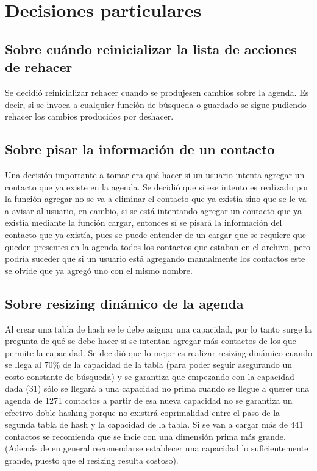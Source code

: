 \documentclass[11pt]{article}
\begin{document}
\section{Decisiones particulares}

    \subsection{Sobre cu\'ando reinicializar la lista de acciones de rehacer}
    Se decidi\'o reinicializar rehacer cuando se produjesen cambios sobre la agenda. Es decir, si se invoca a cualquier funci\'on de b\'usqueda o guardado se sigue pudiendo rehacer los cambios producidos por deshacer.

    \subsection{Sobre pisar la informaci\'on de un contacto}
    Una decisi\'on importante a tomar era qu\'e hacer si un usuario intenta agregar un contacto que ya existe en la agenda. Se decidi\'o que si ese intento es realizado por la funci\'on agregar no se va a eliminar el contacto que ya exist\'ia sino que se le va a avisar al usuario, en cambio, si se est\'a intentando agregar un contacto que ya exist\'ia mediante la funci\'on cargar, entonces s\'i se pisar\'a la informaci\'on del contacto que ya exist\'ia,
    pues se puede entender de un cargar que se requiere que queden presentes en la agenda todos los contactos que estaban en el archivo, pero podr\'ia suceder que si un usuario est\'a agregando manualmente los contactos este se olvide que ya agreg\'o uno con el mismo nombre.

    \subsection{Sobre resizing din\'amico de la agenda}
    Al crear una tabla de hash se le debe asignar una capacidad, por lo tanto surge la pregunta de qu\'e se debe hacer si se intentan agregar m\'as contactos de los que permite la capacidad. Se decidi\'o que lo mejor 
    es realizar resizing din\'amico cuando se llega al $70\%$ de la capacidad de la tabla (para poder seguir asegurando un costo constante de b\'usqueda) y se garantiza que empezando con la capacidad dada (31) s\'olo se llegar\'a a una capacidad no prima cuando se llegue a querer una agenda de 1271 contactos a partir de esa nueva capacidad no se garantiza un efectivo doble hashing porque no existir\'a coprimalidad entre el paso de la segunda tabla de hash y la capacidad de la tabla. Si se van a cargar m\'as de 441 contactos se recomienda que se incie con una dimensi\'on prima m\'as grande. (Adem\'as de en general recomendarse establecer una capacidad lo suficientemente grande, puesto que el resizing resulta costoso).
\end{document}

